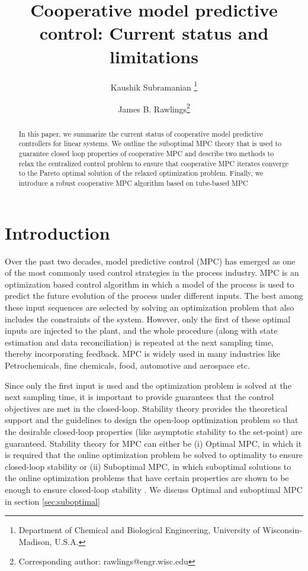 \documentclass[10pt]{article}
\title{Cooperative  model predictive control: Current status and  limitations }
\author{Kaushik Subramanian \thanks{Department of Chemical and Biological
     Engineering, University of Wisconsin-Madison, U.S.A.}  \and James
  B. Rawlings\footnotemark[1] \thanks{Corresponding author: rawlings@engr.wisc.edu}}
\theoremstyle{definition}
\begin{document}
\maketitle
\begin{abstract}
In this paper, we summarize the current status of cooperative model
predictive controllers for linear systems. We outline the suboptimal
MPC theory that is used to guarantee closed loop properties of
cooperative MPC and describe two methods to relax the centralized control problem to ensure that cooperative MPC
iterates converge to the Pareto optimal solution of the relaxed optimization problem. Finally, we introduce a robust cooperative MPC algorithm based on tube-based MPC
\end{abstract}

\section{Introduction}
\label{sec:introduction}
 Over the
past two decades, model predictive control (MPC) has emerged as one of the
most commonly used control strategies in the process industry. MPC is
an optimization based control algorithm in which a model of the
process is used to predict the future evolution of the process under
different inputs. The best among these input sequences are selected by
solving an optimization problem that also includes the constraints of
the system. However, only the first of these optimal inputs are
injected to the plant, and the whole procedure (along with state
estimation and data reconciliation) is repeated at the next
sampling time, thereby incorporating feedback. MPC is widely used in
many industries like Petrochemicals, fine chemicals, food, automotive
and aerospace etc. \citep{qin:badgwell:2003}

Since only the first input is used and the optimization problem is
solved at the next sampling time, it is important to provide
guarantees that the control objectives are met in the
closed-loop. Stability theory provides the theoretical support and the
guidelines to design the open-loop optimization problem so that the
desirable closed-loop properties (like asymptotic stability to the
set-point) are guaranteed. Stability theory for MPC can either be (i)
Optimal MPC, in which it is required that the online optimization
problem be solved to optimality to ensure closed-loop stability  or (ii) Suboptimal MPC, in which
suboptimal solutions to the online optimization problems that have
certain properties are shown to be enough to ensure closed-loop
stability \citep[Chap 2]{rawlings:mayne:2009}. We discuss Optimal and suboptimal MPC in section \ref{sec:suboptimal}
\end{document}
